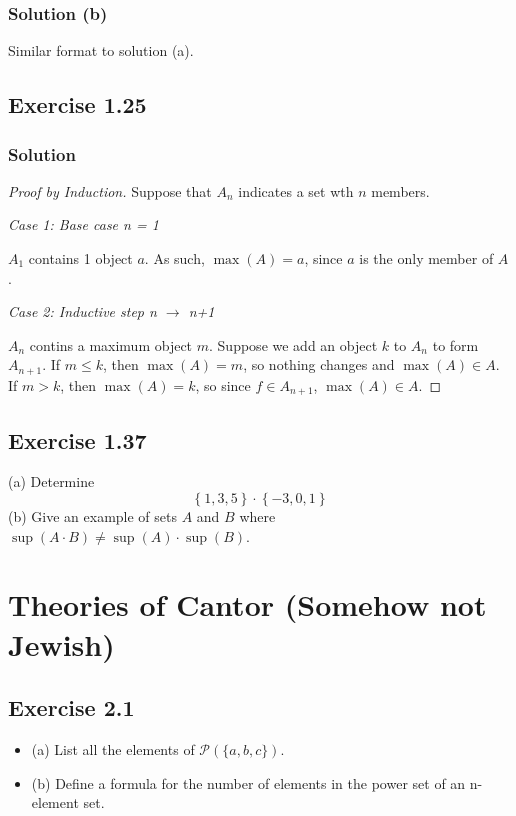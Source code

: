 \documentclass[12pt]{report}
\begin{document}
\subsection{Solution (b)}
    Similar format to solution (a).

\pagebreak
\section{Exercise 1.25}

\subsection*{Solution}
    \begin{proof}[Proof by Induction]
        Suppose that $A_n$ indicates a set wth $n$ members.

        \textit{Case 1: Base case n = 1}

        $A_1$ contains 1 object $a$. As such, $\max(A) = a$, since $a$ is the only member of $A$.

        \textit{Case 2: Inductive step n $\rightarrow$ n+1}

        $A_n$ contins a maximum object $m$.
        Suppose we add an object $k$ to $A_n$ to form $A_{n+1}$.
        If $m \leq k$, then $\max(A) = m$, so nothing changes and $\max(A) \in A$.
        If $m > k$, then $\max(A) = k$, so since $f \in A_{n+1}$, $\max(A) \in A$.
    \end{proof}

\pagebreak
\section{Exercise 1.37}
(a) Determine
\[ \left\{1,3,5\right\} \cdot \left\{-3,0,1\right\} \]
(b) Give an example of sets $A$ and $B$ where $\sup(A\cdot B) \ne \sup(A) \cdot \sup(B)$.

\chapter{Theories of Cantor (Somehow not Jewish)}
\section{Exercise 2.1}
\begin{itemize}{}
    \item (a) List all the elements of $\mathcal{P}(\{a,b,c\})$. 
    \item (b) Define a formula for the number of elements in the power set of an n-element set.
\end{itemize}
\end{document}

